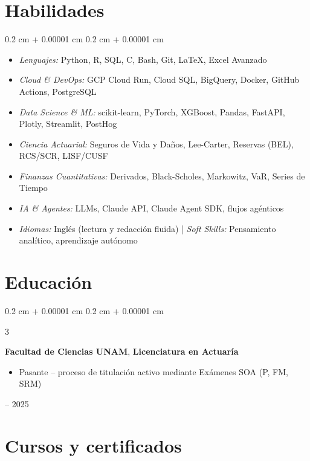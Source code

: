 \documentclass[10pt, letterpaper]{article}
\newenvironment{highlights}{
    \begin{itemize}[
        topsep=0.10 cm,
        parsep=0.10 cm,
        partopsep=0pt,
        itemsep=0pt,
        leftmargin=0.4 cm + 10pt
    ]
}{
    \end{itemize}
} %
\newenvironment{highlightsforbulletentries}{
    \begin{itemize}[
        topsep=0.10 cm,
        parsep=0.10 cm,
        partopsep=0pt,
        itemsep=0pt,
        leftmargin=10pt
    ]
}{
    \end{itemize}
} %
\newenvironment{onecolentry}{
    \begin{adjustwidth}{
        0.2 cm + 0.00001 cm
    }{
        0.2 cm + 0.00001 cm
    }
}{
    \end{adjustwidth}
} %
\newenvironment{threecolentry}[3][]{
    \onecolentry
    \def\thirdColumn{#3}
    \setcolumnwidth{1 cm, \fill, 4.5 cm}
    \begin{paracol}{3}
    {\raggedright #2} \switchcolumn
}{
    \switchcolumn \raggedleft \thirdColumn
    \end{paracol}
    \endonecolentry
} %
\begin{document}
    \section{Habilidades}

\begin{onecolentry}
    \begin{highlightsforbulletentries}
        \item \textit{Lenguajes:} Python, R, SQL, C, Bash, Git, \LaTeX, Excel Avanzado
        \item \textit{Cloud \& DevOps:} GCP Cloud Run, Cloud SQL, BigQuery, Docker, GitHub Actions, PostgreSQL
        \item \textit{Data Science \& ML:} scikit-learn, PyTorch, XGBoost, Pandas, FastAPI, Plotly, Streamlit, PostHog
        \item \textit{Ciencia Actuarial:} Seguros de Vida y Daños, Lee-Carter, Reservas (BEL), RCS/SCR, LISF/CUSF
        \item \textit{Finanzas Cuantitativas:} Derivados, Black-Scholes, Markowitz, VaR, Series de Tiempo
        \item \textit{IA \& Agentes:} LLMs, Claude API, Claude Agent SDK, flujos agénticos
        \item \textit{Idiomas:} Inglés (lectura y redacción fluida) | \textit{Soft Skills:} Pensamiento analítico, aprendizaje autónomo
    \end{highlightsforbulletentries}
\end{onecolentry}

    \section{Educación}

        \begin{threecolentry}{\textbf{}}{
            2021 – 2025
        }
            \textbf{Facultad de Ciencias UNAM}, \textbf{Licenciatura en Actuaría}
            \begin{highlights}
                \item Pasante -- proceso de titulación activo mediante Exámenes SOA (P, FM, SRM)
            \end{highlights}
        \end{threecolentry}

    \section{Cursos y certificados}
\end{document}
